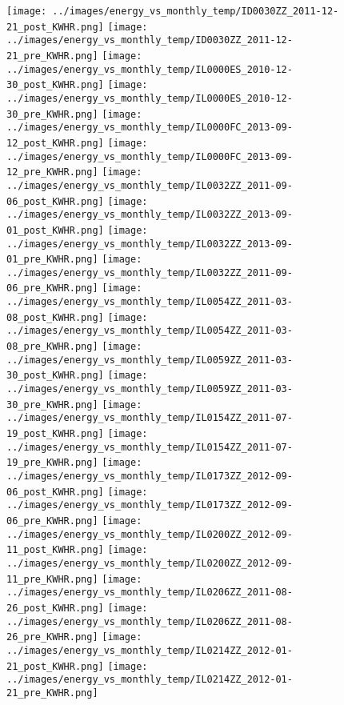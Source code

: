 \clearpage
\begin{figure}
\centering
\texttt{[image: ../images/energy\_vs\_monthly\_temp/ID0030ZZ\_2011-12-21\_post\_KWHR.png]}
\texttt{[image: ../images/energy\_vs\_monthly\_temp/ID0030ZZ\_2011-12-21\_pre\_KWHR.png]}
\texttt{[image: ../images/energy\_vs\_monthly\_temp/IL0000ES\_2010-12-30\_post\_KWHR.png]}
\texttt{[image: ../images/energy\_vs\_monthly\_temp/IL0000ES\_2010-12-30\_pre\_KWHR.png]}
\texttt{[image: ../images/energy\_vs\_monthly\_temp/IL0000FC\_2013-09-12\_post\_KWHR.png]}
\texttt{[image: ../images/energy\_vs\_monthly\_temp/IL0000FC\_2013-09-12\_pre\_KWHR.png]}
\texttt{[image: ../images/energy\_vs\_monthly\_temp/IL0032ZZ\_2011-09-06\_post\_KWHR.png]}
\texttt{[image: ../images/energy\_vs\_monthly\_temp/IL0032ZZ\_2013-09-01\_post\_KWHR.png]}
\texttt{[image: ../images/energy\_vs\_monthly\_temp/IL0032ZZ\_2013-09-01\_pre\_KWHR.png]}
\texttt{[image: ../images/energy\_vs\_monthly\_temp/IL0032ZZ\_2011-09-06\_pre\_KWHR.png]}
\texttt{[image: ../images/energy\_vs\_monthly\_temp/IL0054ZZ\_2011-03-08\_post\_KWHR.png]}
\texttt{[image: ../images/energy\_vs\_monthly\_temp/IL0054ZZ\_2011-03-08\_pre\_KWHR.png]}
\texttt{[image: ../images/energy\_vs\_monthly\_temp/IL0059ZZ\_2011-03-30\_post\_KWHR.png]}
\texttt{[image: ../images/energy\_vs\_monthly\_temp/IL0059ZZ\_2011-03-30\_pre\_KWHR.png]}
\texttt{[image: ../images/energy\_vs\_monthly\_temp/IL0154ZZ\_2011-07-19\_post\_KWHR.png]}
\texttt{[image: ../images/energy\_vs\_monthly\_temp/IL0154ZZ\_2011-07-19\_pre\_KWHR.png]}
\texttt{[image: ../images/energy\_vs\_monthly\_temp/IL0173ZZ\_2012-09-06\_post\_KWHR.png]}
\texttt{[image: ../images/energy\_vs\_monthly\_temp/IL0173ZZ\_2012-09-06\_pre\_KWHR.png]}
\texttt{[image: ../images/energy\_vs\_monthly\_temp/IL0200ZZ\_2012-09-11\_post\_KWHR.png]}
\texttt{[image: ../images/energy\_vs\_monthly\_temp/IL0200ZZ\_2012-09-11\_pre\_KWHR.png]}
\texttt{[image: ../images/energy\_vs\_monthly\_temp/IL0206ZZ\_2011-08-26\_post\_KWHR.png]}
\texttt{[image: ../images/energy\_vs\_monthly\_temp/IL0206ZZ\_2011-08-26\_pre\_KWHR.png]}
\texttt{[image: ../images/energy\_vs\_monthly\_temp/IL0214ZZ\_2012-01-21\_post\_KWHR.png]}
\texttt{[image: ../images/energy\_vs\_monthly\_temp/IL0214ZZ\_2012-01-21\_pre\_KWHR.png]}
\end{figure}

